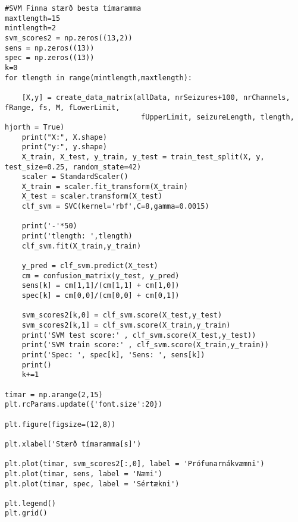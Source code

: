 \documentclass[11pt]{article}
\begin{document}
\begin{verbatim}
#SVM Finna stærð besta tímaramma
maxtlength=15
mintlength=2
svm_scores2 = np.zeros((13,2))
sens = np.zeros((13))
spec = np.zeros((13))
k=0
for tlength in range(mintlength,maxtlength):

    [X,y] = create_data_matrix(allData, nrSeizures+100, nrChannels, fRange, fs, M, fLowerLimit, 
                                fUpperLimit, seizureLength, tlength, hjorth = True)
    print("X:", X.shape)
    print("y:", y.shape)
    X_train, X_test, y_train, y_test = train_test_split(X, y, test_size=0.25, random_state=42)
    scaler = StandardScaler()
    X_train = scaler.fit_transform(X_train)
    X_test = scaler.transform(X_test) 
    clf_svm = SVC(kernel='rbf',C=8,gamma=0.0015)

    print('-'*50)
    print('tlength: ',tlength)
    clf_svm.fit(X_train,y_train)
    
    y_pred = clf_svm.predict(X_test)
    cm = confusion_matrix(y_test, y_pred)
    sens[k] = cm[1,1]/(cm[1,1] + cm[1,0])
    spec[k] = cm[0,0]/(cm[0,0] + cm[0,1])
    
    svm_scores2[k,0] = clf_svm.score(X_test,y_test)
    svm_scores2[k,1] = clf_svm.score(X_train,y_train)
    print('SVM test score:' , clf_svm.score(X_test,y_test))
    print('SVM train score:' , clf_svm.score(X_train,y_train))
    print('Spec: ', spec[k], 'Sens: ', sens[k])
    print()
    k+=1
    
timar = np.arange(2,15)
plt.rcParams.update({'font.size':20})

plt.figure(figsize=(12,8))

plt.xlabel('Stærð tímaramma[s]')

plt.plot(timar, svm_scores2[:,0], label = 'Prófunarnákvæmni')
plt.plot(timar, sens, label = 'Næmi')
plt.plot(timar, spec, label = 'Sértækni')

plt.legend()
plt.grid()
\end{verbatim}
\newpage
\end{document}
